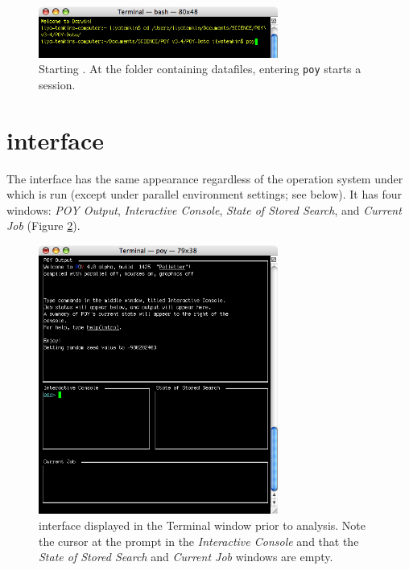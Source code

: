 \begin{figure}[htbp]
   \centering
   \includegraphics[width=0.7\textwidth]{figures/figprelim2.jpg}
   \caption{Starting \poy. At the folder containing datafiles, entering \texttt{poy} starts a \poy session.}
   \label{fig:figprelim2}
\end{figure}

\section{\poy interface}

The \poyv interface has the same appearance regardless of the operation system under which \poyv is run (except under parallel environment settings; see below). It has four windows: \emph{POY Output}, \emph{Interactive Console}, \emph{State of Stored Search}, and \emph{Current Job} (Figure \ref{fig:figinterface}).

\begin{figure}[htbp]
   \centering
   \includegraphics[width=0.7\textwidth]{figures/figinterface.jpg}
   \caption{\poy interface displayed in the Terminal window prior to analysis. Note the cursor at the \poy prompt in the \emph{Interactive Console} and that the \emph{State of Stored Search} and \emph{Current Job} windows are empty.}
   \label{fig:figinterface}
\end{figure}

